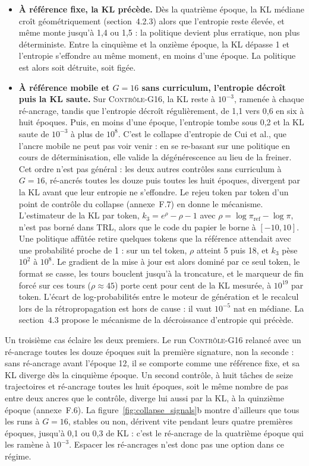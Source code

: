 \documentclass[11pt,a4paper]{article}
\begin{document}
\begin{itemize}
    \item \textbf{À référence fixe, la KL précède.} Dès la quatrième époque, la KL médiane croît géométriquement (section~4.2.3) alors que l'entropie reste élevée, et même monte jusqu'à 1{,}4 ou 1{,}5 : la politique devient plus erratique, non plus déterministe. Entre la cinquième et la onzième époque, la KL dépasse 1 et l'entropie s'effondre au même moment, en moins d'une époque. La politique est alors soit détruite, soit figée.
    \item \textbf{À référence mobile et $G=16$ sans curriculum, l'entropie décroît puis la KL saute.} Sur \textsc{Contrôle-G16}, la KL reste à $10^{-3}$, ramenée à chaque ré-ancrage, tandis que l'entropie décroît régulièrement, de 1{,}1 vers 0{,}6 en six à huit époques. Puis, en moins d'une époque, l'entropie tombe sous 0{,}2 et la KL saute de $10^{-3}$ à plus de $10^{8}$. C'est le collapse d'entropie de Cui et al., que l'ancre mobile ne peut pas voir venir : en se re-basant sur une politique en cours de déterminisation, elle valide la dégénérescence au lieu de la freiner. Cet ordre n'est pas général : les deux autres contrôles sans curriculum à $G=16$, ré-ancrés toutes les douze puis toutes les huit époques, divergent par la KL avant que leur entropie ne s'effondre. Le rejeu token par token d'un point de contrôle du collapse (annexe~F.7) en donne le mécanisme. L'estimateur de la KL par token, $k_3 = e^{\rho} - \rho - 1$ avec $\rho = \log \pi_{\mathrm{ref}} - \log \pi$, n'est pas borné dans TRL, alors que le code du papier le borne à $[-10, 10]$. Une politique affûtée retire quelques tokens que la référence attendait avec une probabilité proche de 1 : sur un tel token, $\rho$ atteint 5 puis 18, et $k_3$ pèse $10^{2}$ à $10^{8}$. Le gradient de la mise à jour est alors dominé par ce seul token, le format se casse, les tours bouclent jusqu'à la troncature, et le marqueur de fin forcé sur ces tours ($\rho \approx 45$) porte cent pour cent de la KL mesurée, à $10^{19}$ par token. L'écart de log-probabilités entre le moteur de génération et le recalcul lors de la rétropropagation est hors de cause : il vaut $10^{-5}$ nat en médiane. La section~4.3 propose le mécanisme de la décroissance d'entropie qui précède.
\end{itemize}

Un troisième cas éclaire les deux premiers. Le run \textsc{Contrôle-G16} relancé avec un ré-ancrage toutes les douze époques suit la première signature, non la seconde : sans ré-ancrage avant l'époque 12, il se comporte comme une référence fixe, et sa KL diverge dès la cinquième époque. Un second contrôle, à huit tâches de seize trajectoires et ré-ancrage toutes les huit époques, soit le même nombre de pas entre deux ancres que le contrôle, diverge lui aussi par la KL, à la quinzième époque (annexe~F.6). La figure~\ref{fig:collapse_signals}b montre d'ailleurs que tous les runs à $G=16$, stables ou non, dérivent vite pendant leurs quatre premières époques, jusqu'à 0{,}1 ou 0{,}3 de KL : c'est le ré-ancrage de la quatrième époque qui les ramène à $10^{-3}$. Espacer les ré-ancrages n'est donc pas une option dans ce régime.
\end{document}
